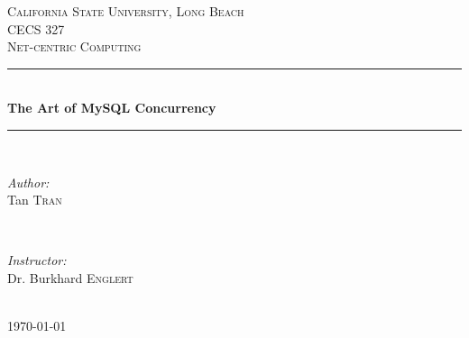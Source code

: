 \documentclass[12pt]{article} %
\begin{document}

\begin{titlepage}

\newcommand{\HRule}{\rule{\linewidth}{0.5mm}} %

\center %

\textsc{\Large California State University, Long Beach}\\[1.5cm] %
\textsc{\Large CECS 327}\\ %
\textsc{\large Net-centric Computing}\\[0.5cm] %

\HRule \\[0.4cm]
{ \huge \bfseries The Art of MySQL Concurrency} %
\HRule \\[1.5cm]

\begin{minipage}{0.4\textwidth}
\begin{flushleft} \large
\emph{Author:}\\
Tan \textsc{Tran} %
\end{flushleft}
\end{minipage}
~
\begin{minipage}{0.4\textwidth}
\begin{flushright} \large
\emph{Instructor:} \\
Dr. Burkhard \textsc{Englert} %
\end{flushright}
\end{minipage}\\[4cm]

{\large \today}\\[3cm] %


\vfill %

\end{titlepage}

\end{document}

